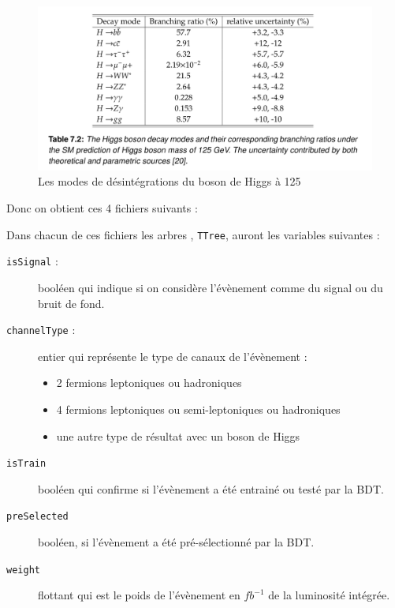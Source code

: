\begin{figure}[h!]
	\centering
	\includegraphics[width=\textwidth]{../img/Higgs_decay_125GeV.png} 
	\caption{
		Les modes de désintégrations du boson de Higgs à 125 \GeV 
		\cite{liu:tel-03405418}
	}
\end{figure}

Donc on obtient ces 4 fichiers suivants :



Dans chacun de ces fichiers les arbres \ROOT, \texttt{TTree}, auront les variables suivantes :

\begin{description}

	\item[\texttt{isSignal} :] booléen qui indique si on considère l'évènement comme du signal ou du bruit de fond.
	
	\item[\texttt{channelType} :] entier qui représente le type de canaux de l'évènement \Figure{\ref{data:code}}:
	\begin{itemize}
		\item 2 fermions leptoniques ou hadroniques
		\item 4 fermions leptoniques ou semi-leptoniques ou hadroniques 
		\item une autre type de résultat avec un boson de Higgs
	\end{itemize}
	
	\item[\texttt{isTrain}] booléen qui confirme si l'évènement a été entrainé ou testé par la BDT.
	
	\item[\texttt{preSelected}] booléen, si l'évènement a été pré-sélectionné par la BDT.
	
	\item[\texttt{weight}] flottant qui est le poids de l'évènement en $fb^{-1}$ de la luminosité intégrée.
	
\end{description}


